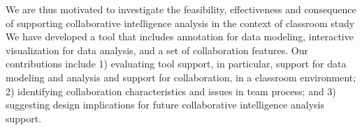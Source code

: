 We are thus
motivated to investigate the feasibility, effectiveness and consequence of
supporting collaborative intelligence analysis in the context of classroom study
We have developed a tool that
includes annotation for data modeling, interactive visualization for data
analysis, and a set of collaboration features. Our contributions include 1) evaluating 
tool support, in particular, support for data modeling and analysis and support 
for collaboration, in a classroom environment; 2) identifying collaboration 
characteristics and issues in team process; and 3) suggesting design 
implications for future collaborative intelligence analysis support.